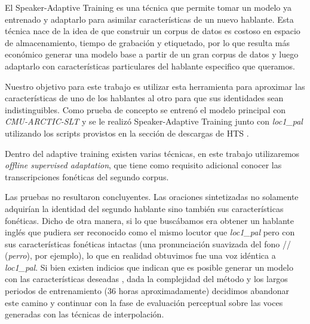 El Speaker-Adaptive Training es una técnica que permite tomar un modelo ya entrenado y adaptarlo para asimilar características de un nuevo hablante. Esta técnica nace de la idea de que construir un corpus de datos es costoso en espacio de almacenamiento, tiempo de grabación y etiquetado, por lo que resulta más económico generar una modelo base a partir de un gran corpus de datos y luego adaptarlo con características particulares del hablante especifico que queramos.

Nuestro objetivo para este trabajo es utilizar esta herramienta para aproximar las características de uno de los hablantes al otro para que sus identidades sean indistinguibles. Como prueba de concepto se entrenó el modelo principal con \textit{CMU-ARCTIC-SLT} y se le realizó Speaker-Adaptive Training junto con \textit{loc1\_pal} utilizando los scripts provistos en la sección de descargas de HTS \cite{speakerAdaptativeTrainingLink}.

Dentro del adaptive training existen varias técnicas, en este trabajo utilizaremos \textit{offline supervised adaptation}, que tiene como requisito adicional conocer las transcripciones fonéticas del segundo corpus. 

Las pruebas no resultaron concluyentes. Las oraciones sintetizadas no solamente adquirían la identidad del segundo hablante sino también sus características fonéticas. Dicho de otra manera, si lo que buscábamos era obtener un hablante inglés que pudiera ser reconocido como el mismo locutor que \textit{loc1\_pal} pero con sus características fonéticas intactas (una pronunciación suavizada del fono // (\textit{perro}), por ejemplo), lo que en realidad obtuvimos fue una voz idéntica a \textit{loc1\_pal}. Si bien existen indicios que indican que es posible generar un modelo con las características deseadas \cite{statisticalParam} \cite{speakerSim}, dada la complejidad del método y los largos periodos de entrenamiento ($36$ horas aproximadamente) decidimos abandonar este camino y continuar con la fase de evaluación perceptual sobre las voces generadas con las técnicas de interpolación.